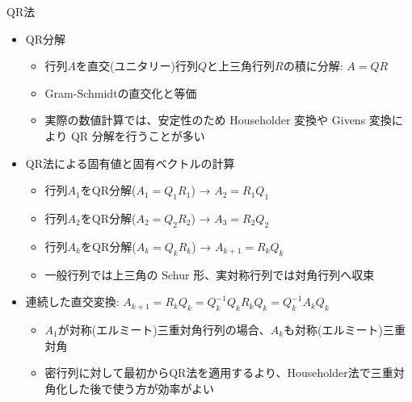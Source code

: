 \begin{frame}[t,fragile]{QR法}
  \begin{itemize}
  \item QR分解
    \begin{itemize}
    \item 行列$A$を直交(ユニタリー)行列$Q$と上三角行列$R$の積に分解: $A=QR$
    \item Gram-Schmidtの直交化と等価
    \item 実際の数値計算では、安定性のため Householder 変換や Givens 変換により QR 分解を行うことが多い
    \end{itemize}
  \item QR法による固有値と固有ベクトルの計算
    \begin{itemize}
    \item 行列$A_1$をQR分解($A_1=Q_1R_1$) → $A_2 = R_1Q_1$ 
    \item 行列$A_2$をQR分解($A_2=Q_2R_2$) → $A_3 = R_2Q_2$ 
    \item 行列$A_k$をQR分解($A_k=Q_kR_k$) → $A_{k+1} = R_kQ_k$
    \item 一般行列では上三角の Schur 形、実対称行列では対角行列へ収束
    \end{itemize}
  \item 連続した直交変換: $A_{k+1} = R_kQ_k = Q_k^{-1}Q_kR_kQ_k = Q_k^{-1}A_kQ_k$
    \begin{itemize}
    \item $A_1$が対称(エルミート)三重対角行列の場合、$A_k$も対称(エルミート)三重対角
    \item 密行列に対して最初からQR法を適用するより、Householder法で三重対角化した後で使う方が効率がよい
    \end{itemize}
  \end{itemize}
\end{frame}
